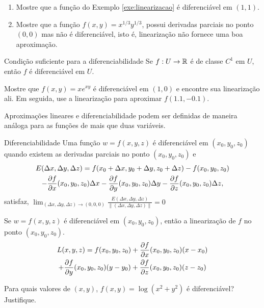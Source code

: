 \begin{exeb}{}{}
\begin{enumerate}
	\item 	Mostre que a função do Exemplo \ref{exe:linearizacao} é diferenciável em \((1,1)\).

	\item Mostre que a função $f(x,y)=x^{1/3}y^{1/3}$, possui derivadas parciais no ponto $(0,0)$ mas não é diferenciável, isto é, linearização não fornece uma boa aproximação.
\end{enumerate}
\end{exeb}
\newpage

\begin{theoremb}{Condição suficiente para a diferenciabilidade}{}
Se $f:U\to \mathbb{R}$ é de classe $C^1$ em $U$, então $f$ é diferenciável em $U$.
\end{theoremb}

\begin{exeb}{}{}
Mostre que $f(x, y) = xe^{xy}$ é diferenciável em $(1, 0)$ e encontre sua linearização ali. Em seguida, use a linearização para aproximar $f( 1.1,-0.1)$.
\end{exeb}
\newpage

Aproximações lineares e diferenciabilidade podem ser definidas de maneira análoga para as funções de mais que duas variáveis.

\begin{caixaazul}{Diferenciabilidade}
Uma função  $w=f(x,y,z)$ é {\color{blue} diferenciável em $(x_0,y_0,z_0)$} quando existem as derivadas parciais no ponto $(x_0,y_0,z_0)$ e
\begin{multline*}
E(\Delta x,\Delta y,\Delta z)=
f(x_0+\Delta x,y_0+\Delta y,z_0+\Delta z)-f(x_0,y_0,z_0)\\-\frac{\partial f}{\partial x}(x_0,y_0,z_0)\Delta x-\frac{\partial f}{\partial y}(x_0,y_0,z_0) \Delta y-\frac{\partial f}{\partial z}(x_0,y_0,z_0)\Delta z,
\end{multline*}
satisfaz, $\displaystyle\lim_{(\Delta x,\Delta y,\Delta z)\to(0,0,0)}\frac{E(\Delta x,\Delta y,\Delta z)}{\|(\Delta x,\Delta y,\Delta z)\|}=0$
\end{caixaazul}

Se $w=f(x,y,z)$ é diferenciável em $(x_0,y_0,z_0)$, então a {\color{blue}linearização} de $f$ no ponto $(x_0,y_0,z_0)$.
{\color{blue}\begin{multline*}
		L(x,y,z)=f(x_0,y_0,z_0)+\frac{\partial f}{\partial x}(x_0,y_0,z_0)(x-x_0)\\+\frac{\partial f}{\partial y}(x_0,y_0,z_0)(y-y_0)+\frac{\partial f}{\partial z}(x_0,y_0,z_0)(z-z_0)
\end{multline*}}
\begin{casab}{}{}
Para quais valores de $(x,y)$,  $f(x,y)=\log(x^2+y^2)$  é diferenciável? Justifique.
\end{casab}
\newpage
{}

